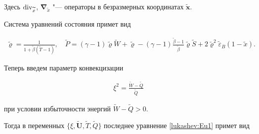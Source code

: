 Здесь $ {\mathop{\rm div}\nolimits}_{\widetilde{x}}$,  $\boldsymbol \nabla_{\widetilde{x}}$ "--- операторы в безразмерных координатах $\widetilde{\boldsymbol x}$.



Система уравнений состояния примет вид

\begin{gather}

\widetilde{\varrho}=\frac1{1+\widetilde{\beta}(\widetilde{T}-1)},

\quad 

\widetilde{P}=(\gamma-1)\widetilde{\varrho}\widetilde{W}+\widetilde{\varrho}-

(\gamma-1)\frac{\widetilde{\beta}-1}{\widetilde{\beta}} \widetilde{\varrho}

\widetilde{S} +2\widetilde{\varrho}^2 \widetilde{\varepsilon}_B(1-\widetilde{x}).

\label{lukashev:0UrSost}

\end{gather}



Теперь введем параметр конвекцизации

\begin{gather}

\xi^2=\frac{\widetilde{W}- \widetilde{Q}}{\widetilde{Q}}

\label{lukashev:xi}

\end{gather}

при условии избыточности энергий $\widetilde{W}- \widetilde{Q}>0$.

Тогда в переменных $\{\xi, \widetilde{\boldsymbol U}, \widetilde{T}, \widetilde{Q}\}$ последнее уравнение \eqref{lukashev:Eu1} примет вид

